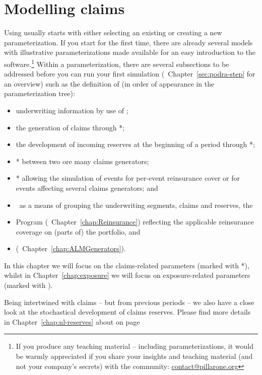 \chapter{Modelling claims}
\label{chap:claims}

Using \RA{} usually starts with either selecting an existing or creating a new parameterization. If you start \RA{} for the first time, there are already several models with illustrative parameterizations made available for an easy introduction to the software.\footnote{If you produce any teaching material -- including parameterizations, it would be warmly appreciated if you share your insights and teaching material (and not your company's secrets) with the community: \href{mailto:contact@pillarone.org}{contact@pillarone.org}}  Within a parameterization, there are several subsections to be addressed before you can run your first simulation (\cf~Chapter~\ref{sec:podra-step} for an overview) such as the definition of (in order of appearance in the parameterization tree):

\begin{itemize}
	\item underwriting information by use of \dag;
	\item the generation of claims through *;
	\item the development of incoming reserves at the beginning of a period through *;
	\item {}* between two ore many claims generators;
	\item {}* allowing the simulation of events for per-event reinsurance cover or for events affecting several claims generators; and
	\item {}\dag~as a means of grouping the underwriting segments, claims and reserves, the
	\item {} Program (\cf~Chapter~\ref{chap:Reinsurance}) reflecting the applicable reinsurance coverage on (parts of) the portfolio, and 
	\item {} (\cf~Chapter~\ref{chap:ALMGenerators}).
\end{itemize}

In this chapter we will focus on the claims-related parameters (marked with *), whilst in Chapter~\ref{chap:exposure} we will focus on exposure-related parameters (marked with \dag). 

Being intertwined with claims -- but from previous periods -- we also have a close look at the stochastical development of claims reserves. Please find more details in Chapter~\ref{chap:nl-reserves} about  on page~\pageref{chap:nl-reserves}\,\ff

